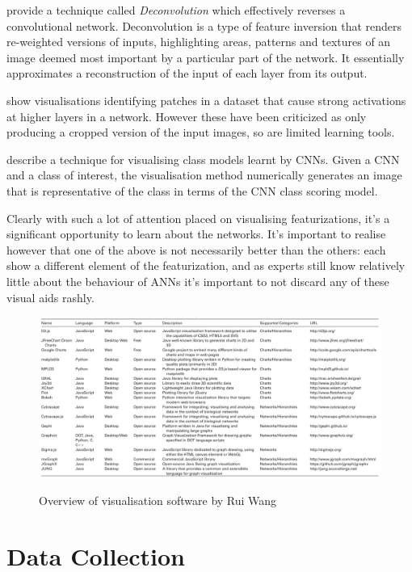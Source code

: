 \documentclass[a4paper,11pt,titlepage]{article}
\begin{document}
		\textbf{\cite{Zeiler2013}} provide a technique called \textit{Deconvolution} \cite{Zeiler2011} which effectively reverses a convolutional network. Deconvolution is a type of feature inversion that renders re-weighted versions of inputs, highlighting areas, patterns and textures of an image deemed most important by a particular part of the network. It essentially approximates a reconstruction of the input of each layer from its output.
		\par
		\textbf{\cite{Donahue2013}} show visualisations identifying patches in a dataset that cause strong activations at higher layers in a network. However these have been criticized as only producing a cropped version of the input images, so are limited learning tools. 
		\par 
		\textbf{\cite{Simonyan2013}} describe a technique for visualising class models learnt by CNNs. Given a CNN and a class of interest, the visualisation method numerically generates an image that is representative of the class in terms of the CNN class scoring model.
		\par 
		Clearly with such a lot of attention placed on visualising featurizations, it's a significant opportunity to learn about the networks. It's important to realise however that one of the above is not necessarily better than the others: each show a different element of the featurization, and as experts still know relatively little about the behaviour of ANNs it's important to not discard any of these visual aids rashly.
		
		\begin{figure}[H]
    			\centering	
		{{\includegraphics[width=18cm]
    				{img/rui_wang_vis_overview} 
    			}}%
    			\caption{Overview of visualisation software by Rui Wang}%
    		\label{fig:studentprofile}
		\end{figure}
		
\section{Data Collection}	
\end{document}
